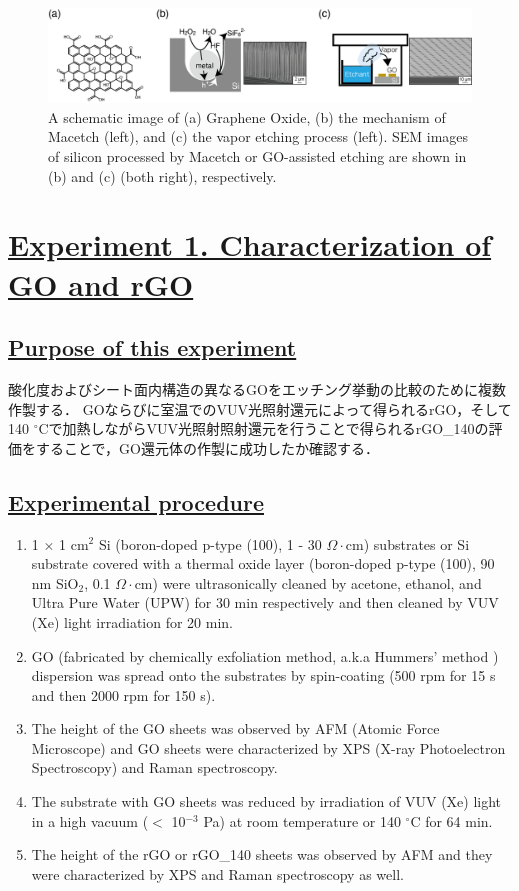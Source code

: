 \documentclass[platex,dvipdfmx]{jlreq}			%
\begin{document}
\begin{figure}
    \centering
    \includegraphics[width=155mm]{figures/figure1.png}
    \caption{A schematic image of (a) Graphene Oxide, (b) the mechanism of Macetch (left), and (c) the vapor etching process (left). SEM images of silicon processed by Macetch or GO-assisted etching are shown in (b) and (c) (both right), respectively.}
    \label{fig:schematic_model}
\end{figure}

\section*{\ul{Experiment 1. Characterization of GO and rGO}}

\subsection*{\ul{Purpose of this experiment}}
酸化度およびシート面内構造の異なるGOをエッチング挙動の比較のために複数作製する．
GOならびに室温でのVUV光照射還元によって得られるrGO，そして140 ${}^\circ$Cで加熱しながらVUV光照射照射還元を行うことで得られるrGO\_140の評価をすることで，GO還元体の作製に成功したか確認する．

\subsection*{\ul{Experimental procedure}}
\begin{enumerate}
    \item 1 $\times$ 1 cm$^2$ Si (boron-doped p-type (100), 1 - 30 $\Omega\cdot$cm) substrates or Si substrate covered with a thermal oxide layer (boron-doped p-type (100), 90 nm SiO$_2$, 0.1 $\Omega\cdot$cm) were ultrasonically cleaned by acetone, ethanol, and Ultra Pure Water (UPW) for 30 min respectively and then cleaned by VUV (Xe) light irradiation for 20 min.
    \item GO (fabricated by chemically exfoliation method, a.k.a Hummers' method ) dispersion was spread onto the substrates by spin-coating (500 rpm for 15 s and then 2000 rpm for 150 s).
    \item The height of the GO sheets was observed by AFM (Atomic Force Microscope) and GO sheets were characterized by XPS (X-ray Photoelectron Spectroscopy) and Raman spectroscopy.
    \item The substrate with GO sheets was reduced by irradiation of VUV (Xe) light in a high vacuum ($<$ 10$^{-3}$ Pa) at room temperature or 140 ${}^\circ$C for 64 min.
    \item The height of the rGO or rGO\_140 sheets was observed by AFM and they were characterized by XPS and Raman spectroscopy as well.
\end{enumerate}
\end{document}
